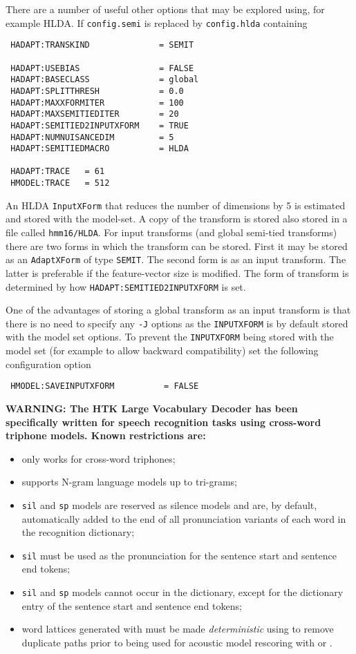 There are a number of useful other options that may be explored using, for example
HLDA. If \texttt{config.semi} is replaced by \texttt{config.hlda} containing
\begin{verbatim}
 HADAPT:TRANSKIND              = SEMIT

 HADAPT:USEBIAS                = FALSE
 HADAPT:BASECLASS              = global
 HADAPT:SPLITTHRESH            = 0.0
 HADAPT:MAXXFORMITER           = 100
 HADAPT:MAXSEMITIEDITER        = 20
 HADAPT:SEMITIED2INPUTXFORM    = TRUE
 HADAPT:NUMNUISANCEDIM         = 5
 HADAPT:SEMITIEDMACRO          = HLDA

 HADAPT:TRACE   = 61
 HMODEL:TRACE   = 512
\end{verbatim}
An HLDA \texttt{InputXForm} that reduces the number of dimensions by 5 is estimated
and stored with the model-set. A copy of the transform is stored also stored in 
a file called \texttt{hmm16/HLDA}. For input transforms (and global semi-tied transforms)
there are two forms in which the transform can be stored. First it may be stored as
an \texttt{AdaptXForm} of type \texttt{SEMIT}. The second form is as an input transform.
The latter is preferable if the feature-vector size is modified. The form of transform
is determined by how \texttt{HADAPT:SEMITIED2INPUTXFORM} is set. 

One of the advantages of storing a global transform as an input transform is that there
is no need to specify any {\tt -J} options as the {\tt INPUTXFORM} is by default
stored with the model set options. To prevent the {\tt INPUTXFORM} being stored
with the model set (for example to allow backward compatibility) set the 
following configuration option
\begin{verbatim}
 HMODEL:SAVEINPUTXFORM          = FALSE
\end{verbatim}

\newpage
{}

{\bf
WARNING: The HTK Large Vocabulary
Decoder  has
been specifically written for speech recognition tasks
using cross-word triphone models. Known restrictions are:
\begin{itemize}
\item only works for cross-word triphones;
\item supports N-gram language models up to tri-grams;
\item \texttt{sil} and \texttt{sp} models are reserved as silence
models and are, by default, automatically added to the end of all
pronunciation variants of each word in the recognition dictionary;
\item  \texttt{sil} must be used as the pronunciation for the sentence start
  and sentence end tokens;
\item \texttt{sil} and \texttt{sp} models cannot occur in the dictionary,
  except for the dictionary entry of the sentence start
  and sentence end tokens;
\item word lattices generated with  must be made {\em
deterministic} using  to remove duplicate paths
prior to being used for acoustic model rescoring
with  or .
\end{itemize}
}

